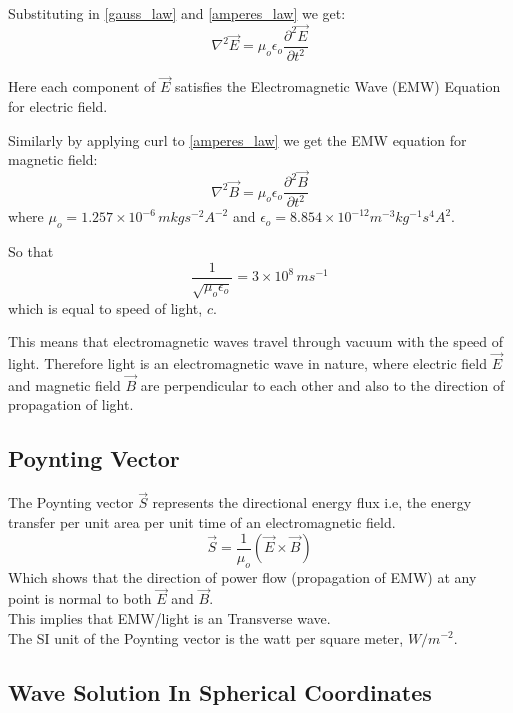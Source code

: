 Substituting in \eqref{gauss_law} and \eqref{amperes_law} we get:
%
   \begin{equation}
   \nabla^2\vec{E} =  \mu_{o}\epsilon_{o}\frac{\partial^2\vec{E}}{\partial t^2}
   \end{equation}

Here each component of $\vec{E}$ satisfies the Electromagnetic Wave (EMW) Equation for electric field.

Similarly by applying curl to \eqref{amperes_law} we get the EMW equation for magnetic field:
%
   \begin{equation}
   \nabla^2\vec{B} =  \mu_{o}\epsilon_{o}\frac{\partial^2\vec{B}}{\partial t^2}
   \end{equation}
%
where $\mu_{o} = 1.257\times10^{-6} \, m kg s^{-2} A^{-2}$ and $\epsilon_{o} = 8.854 \times 10^{-12} m^{-3} kg^{-1} s^4 A^2$.

So that
%
   \begin{equation}
   \frac{1}{\sqrt{\mu_{o}\epsilon_{o}}} = 3\times10^8 \, ms^{-1}
   \end{equation}
%
which is equal to speed of light, $c$.

This means that electromagnetic waves travel through vacuum with the speed of light. Therefore light is an electromagnetic wave in nature, where electric field $\vec{E}$ and magnetic field $\vec{B}$ are perpendicular to each other and also to the direction of propagation of light.


\subsection{Poynting Vector}
The Poynting vector $\vec{S}$ represents the directional energy flux i.e, the energy transfer per unit area per unit time of an electromagnetic field.\\
\begin{equation}
\vec{S} = \frac{1}{\mu_{o}}(\vec{E}\times\vec{B})
\end{equation}
Which shows that the direction of power flow (propagation of EMW) at any point is normal to both $\vec{E}$ and $\vec{B}$.\\
This implies that EMW/light is an Transverse wave.\\
The SI unit of the Poynting vector is the watt per square meter, $W/m^{-2}$.

\subsection{Wave Solution In Spherical Coordinates}

